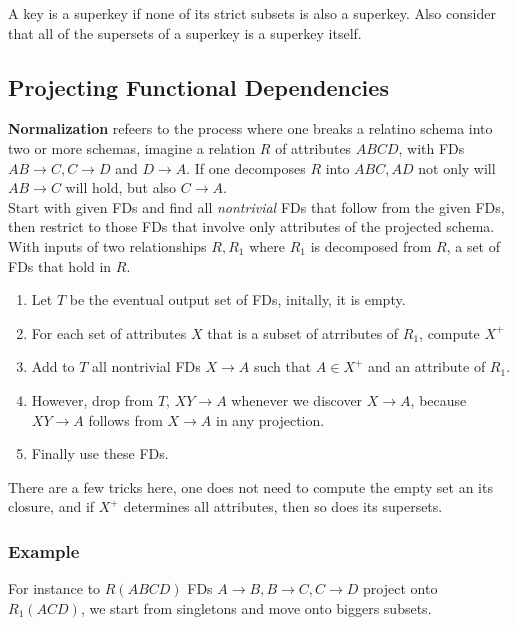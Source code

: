 \documentclass[11pt,a4paper,twocolumn]{book}
\begin{document}
A key is a superkey if none of its strict subsets is also a superkey. Also consider that all of the supersets of a superkey is a superkey itself.\\

\subsection{Projecting Functional Dependencies}

\textbf{Normalization} refeers to the process where one breaks a relatino schema into two or more schemas, imagine a relation $R$ of attributes $ABCD$, with FDs $AB \to C, C \to D$ and $D \to A$. If one decomposes $R$ into $ABC, AD$ not only will $AB \to C$ will hold, but also $C \to A$.\\

Start with given FDs and find all \textit{nontrivial} FDs that follow from the given FDs, then restrict to those FDs that involve only attributes of the projected schema.\\

With inputs of two relationships $R, R_1$ where $R_1$ is decomposed from $R$, a set of FDs that hold in $R$.

\begin{enumerate}
\item Let $T$ be the eventual output set of FDs, initally, it is empty.
\item For each set of attributes $X$ that is a subset of atrributes of $R_1$, compute $X^+$
\item Add to $T$ all nontrivial FDs $X \to A$ such that $A \in X^+$ and an attribute of $R_1$.
\item However, drop from $T$, $XY \to A$ whenever we discover $X \to A$, because $XY \to A$ follows from $X \to A$ in any projection.
\item Finally use these FDs.
\end{enumerate}

There are a few tricks here, one does not need to compute the empty set an its closure, and if $X^+$ determines all attributes, then so does its supersets.\\

\subsubsection{Example}

For instance to $R(ABCD)$ FDs $A \to B, B \to C, C \to D$ project onto $R_1(ACD)$, we start from singletons and move onto biggers subsets. 
\end{document}
